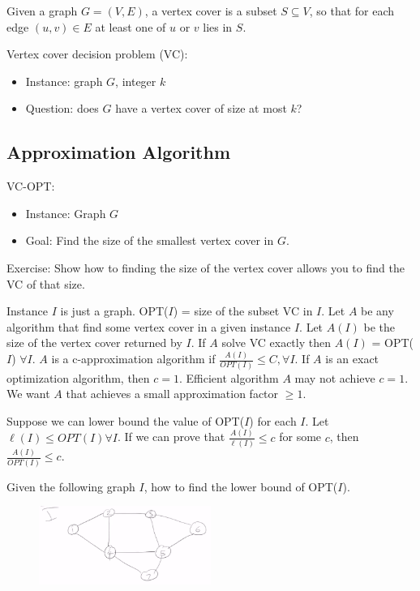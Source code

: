 Given a graph $G=(V,E)$, a vertex cover is a subset $S \subseteq V$, so that for each edge $(u,v) \in E$ at least one of $u$ or $v$ lies in $S$.

Vertex cover decision problem (VC):
\begin{itemize} 
	\item Instance: graph $G$, integer $k$
	\item Question: does $G$ have a vertex cover of size at most $k$?
\end{itemize}

\subsection{Approximation Algorithm}
VC-OPT:
\begin{itemize}
	\item Instance: Graph $G$
	\item Goal: Find the size of the smallest vertex cover in $G$.
\end{itemize}

Exercise: Show how to finding the size of the vertex cover allows you to find the VC of that size.

Instance $I$ is just a graph. OPT($I$) = size of the subset VC in $I$. Let $A$ be any algorithm that find some vertex cover in a given instance $I$. Let $A(I)$ be the size of the vertex cover returned by $I$. If $A$ solve VC exactly then $A(I)$ = OPT($I$) $\forall I$. $A$ is a c-approximation algorithm if $\frac{A(I)}{OPT(I)} \le C, \forall I$. If $A$ is an exact optimization algorithm, then $c = 1$. Efficient algorithm $A$ may not achieve $c = 1$. We want $A$ that achieves a small approximation factor $\ge 1$.

Suppose we can lower bound the value of OPT($I$) for each $I$. Let $\ell (I) \le OPT(I) \forall I$. If we can prove that $\frac{A(I)}{\ell(I)} \le c$ for some $c$, then $\frac{A(I)}{OPT(I)} \le c$.

Given the following graph $I$, how to find the lower bound of OPT($I$).
\begin{figure}[H]
	\centering
	\includegraphics[width=0.5\textwidth]{fig/vc-low-bound.png}
\end{figure}

